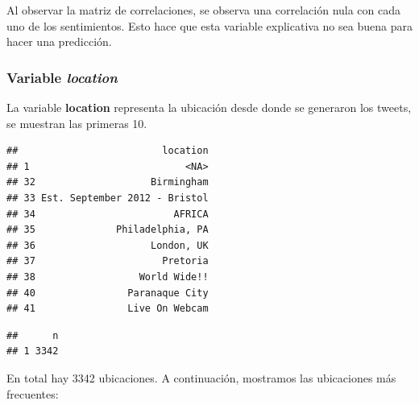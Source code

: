 \documentclass[
]{article}
\newenvironment{Shaded}{\begin{snugshade}}{\end{snugshade}}
\newcommand{\DecValTok}[1]{\textcolor[rgb]{0.00,0.00,0.81}{#1}}
\newcommand{\KeywordTok}[1]{\textcolor[rgb]{0.13,0.29,0.53}{\textbf{#1}}}
\newcommand{\NormalTok}[1]{#1}
\newcommand{\OperatorTok}[1]{\textcolor[rgb]{0.81,0.36,0.00}{\textbf{#1}}}
\newcommand{\StringTok}[1]{\textcolor[rgb]{0.31,0.60,0.02}{#1}}
\begin{document}
Al observar la matriz de correlaciones, se observa una correlación nula
con cada uno de los sentimientos. Esto hace que esta variable
explicativa no sea buena para hacer una predicción.

\hypertarget{variable-location}{%
\subsubsection{\texorpdfstring{Variable
\emph{location}}{Variable location}}\label{variable-location}}

La variable \textbf{location} representa la ubicación desde donde se
generaron los tweets, se muestran las primeras 10.

\begin{Shaded}
\end{Shaded}

\begin{verbatim}
##                         location
## 1                           <NA>
## 32                    Birmingham
## 33 Est. September 2012 - Bristol
## 34                        AFRICA
## 35              Philadelphia, PA
## 36                    London, UK
## 37                      Pretoria
## 38                  World Wide!!
## 40                Paranaque City
## 41                Live On Webcam
\end{verbatim}

\begin{Shaded}
\end{Shaded}

\begin{verbatim}
##      n
## 1 3342
\end{verbatim}

En total hay 3342 ubicaciones. A continuación, mostramos las ubicaciones
más frecuentes:

\begin{Shaded}
\end{Shaded}
\end{document}
